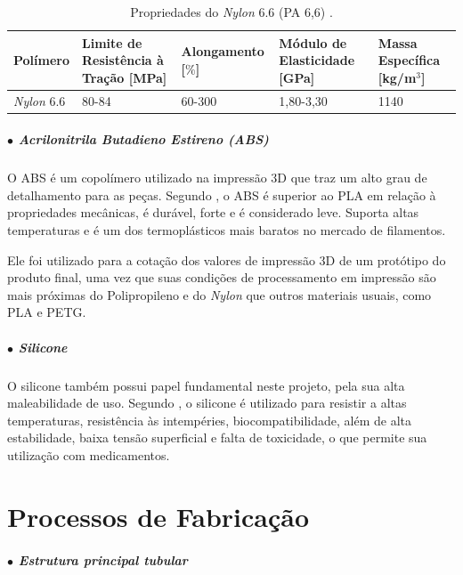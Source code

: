 \begin{table}[ht]
    \centering
    \caption{Propriedades do \textit{Nylon} 6.6 (PA 6,6) \cite{mechanicalPolymers}.}
    \label{tab:PropPA6}
    \begin{adjustbox}{max width = \textwidth}
        \begin{tabular}{|C{2cm}|C{3cm}|C{3cm}|C{3cm}|C{2.5cm}|}
            \hline
            \textbf{Polímero} & \textbf{Limite de Resistência à Tração [MPa]} & \textbf{Alongamento [$\%$] } & \textbf{Módulo de Elasticidade [GPa]} & \textbf{Massa Específica [kg/m$^3$]} \\ \hline
            
              \textit{Nylon} 6.6 & 80-84 & 60-300 & 1,80-3,30 & 1140
             \\ \hline
        \end{tabular}
    \end{adjustbox}
\end{table}

\subparagraph*{$\bullet$ Acrilonitrila Butadieno Estireno (ABS)}\hfill

O ABS é um copolímero utilizado na impressão 3D que traz um alto grau de detalhamento para as peças. Segundo \cite{Imp3D_Polimeros}, o ABS é superior ao PLA em relação à propriedades mecânicas, é durável, forte e é considerado leve. Suporta altas temperaturas e é um dos termoplásticos mais baratos no mercado de filamentos.

Ele foi utilizado para a cotação dos valores de impressão 3D de um protótipo do produto final, uma vez que suas condições de processamento em impressão são mais próximas do Polipropileno e do \textit{Nylon} que outros materiais usuais, como PLA e PETG.

\subparagraph*{$\bullet$ Silicone} \hfill

O silicone também possui papel fundamental neste projeto, pela sua alta maleabilidade de uso. Segundo \cite{Silicone_estudo}, o silicone é utilizado para resistir a altas temperaturas, resistência às intempéries, biocompatibilidade, além de alta estabilidade, baixa tensão superficial e falta de toxicidade, o que permite sua utilização com medicamentos.

\section{Processos de Fabricação} 
\label{section:fabricacao}

\subparagraph*{$\bullet$ Estrutura principal tubular} \hfill

